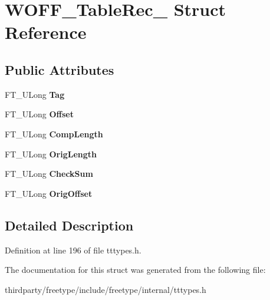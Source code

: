 \hypertarget{struct_w_o_f_f___table_rec__}{}\section{W\+O\+F\+F\+\_\+\+Table\+Rec\+\_\+ Struct Reference}
\label{struct_w_o_f_f___table_rec__}
\subsection*{Public Attributes}
\begin{DoxyCompactItemize}
\item 
\mbox{\label{struct_w_o_f_f___table_rec___a180f01c612c0f50795b78764bc6d85a1}} 
F\+T\+\_\+\+U\+Long {\bfseries Tag}
\item 
\mbox{\label{struct_w_o_f_f___table_rec___aac56c27dce54415c889ad2be4045851c}} 
F\+T\+\_\+\+U\+Long {\bfseries Offset}
\item 
\mbox{\label{struct_w_o_f_f___table_rec___a273aa7c18d810be6808e2c857320f7c5}} 
F\+T\+\_\+\+U\+Long {\bfseries Comp\+Length}
\item 
\mbox{\label{struct_w_o_f_f___table_rec___a42dd043bbef5656aa32461fc0def8340}} 
F\+T\+\_\+\+U\+Long {\bfseries Orig\+Length}
\item 
\mbox{\label{struct_w_o_f_f___table_rec___a7731a05b663d6bc3548d7c2a9a59f432}} 
F\+T\+\_\+\+U\+Long {\bfseries Check\+Sum}
\item 
\mbox{\label{struct_w_o_f_f___table_rec___a1722f43cd00f44068a777808525624f1}} 
F\+T\+\_\+\+U\+Long {\bfseries Orig\+Offset}
\end{DoxyCompactItemize}


\subsection{Detailed Description}


Definition at line 196 of file tttypes.\+h.



The documentation for this struct was generated from the following file\+:\begin{DoxyCompactItemize}
\item 
thirdparty/freetype/include/freetype/internal/tttypes.\+h\end{DoxyCompactItemize}
